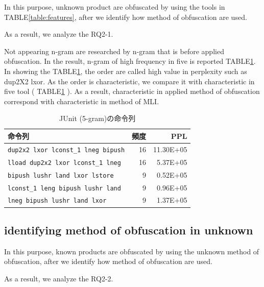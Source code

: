 \documentclass[conference]{IEEEtran}
\begin{document}
In this purpose, unknown product are obfuscated by using the tools in
TABLE\ref{table:features}, after we identify how method of obfuscation
are used.

As a result, we analyze the RQ2-1.

Not appearing n-gram are researched by n-gram that is before applied
obfuscation.  In the result, n-gram of high frequency in five is
reported TABLE\ref{table:junit}.  In showing the
TABLE\ref{table:junit}, the order are called high value in perplexity
such as dup2X2 lxor.  As the order is characteristic, we compare it
with characteristic in five tool ( TABLE\ref{table:junit} ).  As a
result, characteristic in applied method of obfuscation correspond
with characteristic in method of MLI.

\begin{table}[t]
  \centering
  \footnotesize{
    \caption{JUnit (5-gram)の命令列}\label{table:junit}
  \begin{tabular}{l|r|r}
    命令列 & 頻度 & PPL\\ \hline
    \texttt{dup2x2 lxor lconst\_1 lneg bipush}   & 16 & 11.30E+05 \\
    \texttt{lload dup2x2 lxor lconst\_1 lneg}    & 16 &   5.37E+05 \\
    \texttt{bipush lushr land lxor lstore}       &  9 &   0.52E+05 \\
    \texttt{lconst\_1 leng bipush lushr land}    &  9 &   0.96E+05 \\
    \texttt{lneg bipush lushr land lxor}         &  9 &  1.37E+05 \\
  \end{tabular}}
\end{table}

\subsection{identifying method of obfuscation in unknown}

In this purpose, known products are obfuscated by using the unknown
method of obfuscation, after we identify how method of obfuscation are
used.

As a result, we analyze the RQ2-2.
\end{document}
